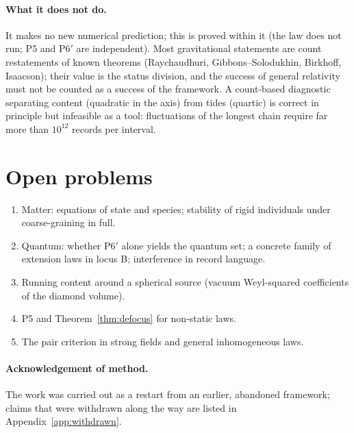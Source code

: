 \documentclass[11pt]{article}
\theoremstyle{definition}
\theoremstyle{remark}
\begin{document}
\paragraph{What it does not do.} It makes no new numerical prediction; this is proved within it (the law does not run; P5 and P6$'$ are independent). Most gravitational statements are count restatements of known theorems (Raychaudhuri, Gibbons--Solodukhin, Birkhoff, Isaacson); their value is the status division, and the success of general relativity must not be counted as a success of the framework. A count-based diagnostic separating content (quadratic in the axis) from tides (quartic) is correct in principle but infeasible as a tool: fluctuations of the longest chain require far more than $10^{12}$ records per interval.

\section{Open problems}\label{sec:open}
\begin{enumerate}[nosep]
\item Matter: equations of state and species; stability of rigid individuals under coarse-graining in full.
\item Quantum: whether P6$'$ alone yields the quantum set; a concrete family of extension laws in locus B; interference in record language.
\item Running content around a spherical source (vacuum Weyl-squared coefficients of the diamond volume).
\item P5 and Theorem~\ref{thm:defocus} for non-static laws.
\item The pair criterion in strong fields and general inhomogeneous laws.
\end{enumerate}

\paragraph{Acknowledgement of method.} The work was carried out as a restart from an earlier, abandoned framework; claims that were withdrawn along the way are listed in Appendix~\ref{app:withdrawn}.

\appendix
\end{document}
